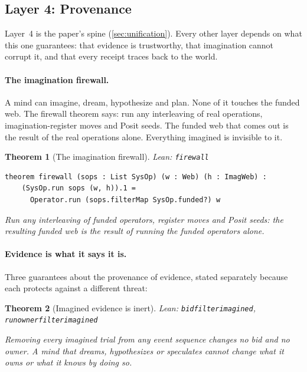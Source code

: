 \documentclass[11pt]{article}
\newcommand{\leanus}{\textunderscore\allowbreak}
\newcommand{\lean}[1]{{\let\_\leanus\texttt{#1}}}
\newtheorem{theorem}{Theorem}[section]
\theoremstyle{remark}
\begin{document}
\subsection{Layer 4: Provenance}

Layer~4 is the paper's spine (\cref{sec:unification}). Every other layer depends on what
this one guarantees: that evidence is trustworthy, that imagination cannot corrupt it, and
that every receipt traces back to the world.

\paragraph{The imagination firewall.}

A mind can imagine, dream, hypothesize and plan. None of it touches the funded web. The
firewall theorem says: run any interleaving of real operations, imagination-register moves
and Posit seeds. The funded web that comes out is the result of the real operations alone.
Everything imagined is invisible to it.

\begin{theorem}[The imagination firewall]
{\small\sloppy Lean: \lean{firewall}\par}
\begin{lstlisting}
theorem firewall (sops : List SysOp) (w : Web) (h : ImagWeb) :
    (SysOp.run sops (w, h)).1 =
      Operator.run (sops.filterMap SysOp.funded?) w
\end{lstlisting}
Run any interleaving of funded operators, register moves and Posit seeds: the resulting
funded web is the result of running the funded operators alone.
\end{theorem}

\paragraph{Evidence is what it says it is.}

Three guarantees about the provenance of evidence, stated separately because each
protects against a different threat:

\begin{theorem}[Imagined evidence is inert]
{\small\sloppy Lean: \lean{bid\_filter\_imagined},
\lean{run\_owner\_filter\_imagined}\par}
Removing every imagined trial from any event sequence changes no bid and no owner. A mind
that dreams, hypothesizes or speculates cannot change what it owns or what it knows by
doing so.
\end{theorem}
\end{document}
